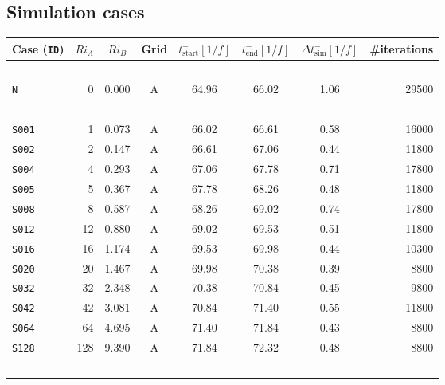 \documentclass[11pt]{article}
\begin{document}
\subsection{Simulation cases}
%
\begin{table}
    \newcommand{\rc}{\rowcolor{blue!20}}
    \centering
    \begin{tabular}{lrcccccr}
        Case (\texttt{ID}) & $Ri_\Lambda$ & $Ri_B$ & Grid &  $t^-_\text{start} [1/f]$ &  $t^-_\text{end} [1/f]$ &  $\Delta t^-_\text{sim} [1/f]$ &  \#iterations \\ \bottomrule
        ~\vspace{-.75em}\\
        \texttt{N    } &   0 & \hphantom{1}0.000 & A & 64.96 & 66.02 & 1.06 & 29500  \\ \bottomrule[0.25pt] 
        ~\vspace{-.75em}\\
        \texttt{S001 } &   1 & \hphantom{1}0.073 & A & 66.02 & 66.61 & 0.58 & 16000  \\
        \rc\texttt{S002 } &   2 & \hphantom{1}0.147 & A & 66.61 & 67.06 & 0.44 & 11800  \\
        \texttt{S004 } &   4 & \hphantom{1}0.293 & A & 67.06 & 67.78 & 0.71 & 17800  \\
        \rc\texttt{S005 } &   5 & \hphantom{1}0.367 & A & 67.78 & 68.26 & 0.48 & 11800  \\
        \texttt{S008 } &   8 & \hphantom{1}0.587 & A & 68.26 & 69.02 & 0.74 & 17800  \\
        \rc\texttt{S012 } &  12 & \hphantom{1}0.880 & A & 69.02 & 69.53 & 0.51 & 11800  \\
        \texttt{S016 } &  16 & \hphantom{1}1.174 & A & 69.53 & 69.98 & 0.44 & 10300  \\
        \rc\texttt{S020 } &  20 & \hphantom{1}1.467 & A & 69.98 & 70.38 & 0.39 & 8800  \\
        \texttt{S032 } &  32 & \hphantom{1}2.348 & A & 70.38 & 70.84 & 0.45 & 9800  \\
        \rc\texttt{S042 } &  42 & \hphantom{1}3.081 & A & 70.84 & 71.40 & 0.55 & 11800  \\
        \texttt{S064 } &  64 & \hphantom{1}4.695 & A & 71.40 & 71.84 & 0.43 & 8800  \\ 
        \rc\texttt{S128 } & 128 & \hphantom{1}9.390 & A & 71.84 & 72.32 & 0.48 & 8800 \\
        ~\vspace{-.75em}\\

\end{tabular}
\end{table}
\end{document}
